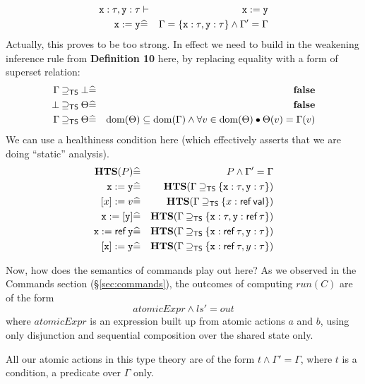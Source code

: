 \begin{eqnarray*}
   \mathtt{x} : \tau, \mathtt{y} : \tau &\vdash& \mathtt{x} := \mathtt{y}
\\ \mathtt{x} := \mathtt{y} &\widehat=& \Gamma = \{\mathtt{x} : \tau, \mathtt{y} : \tau\} \land \Gamma'=\Gamma
\end{eqnarray*}
Actually, this proves to be too strong.
In effect we need to build in the weakening inference rule
from \textbf{Definition 10} here, by replacing equality with a form of
superset relation:
\begin{eqnarray*}
   \Gamma \mathbin{\supseteq_{\mathsf{TS}}} \bot &\widehat=& \mathbf{false}
\\ \bot \mathbin{\supseteq_{\mathsf{TS}}} \Theta &\widehat=& \mathbf{false}
\\ \Gamma \mathbin{\supseteq_{\mathsf{TS}}} \Theta
   &\widehat=&
   \mathrm{dom}(\Theta)\subseteq \mathrm{dom}(\Gamma)
   \land
   \forall v \in \mathrm{dom}(\Theta) \bullet \Theta(v) = \Gamma(v)
\end{eqnarray*}
We can use a healthiness condition here
(which effectively asserts that we are doing ``static'' analysis).
\begin{eqnarray*}
  \mathbf{HTS}(P) &\widehat=& P \land \Gamma'=\Gamma
  \\ \mathtt{x} := \mathtt{y}     &\widehat=& \mathbf{HTS}(\Gamma \mathbin{\supseteq_{\mathsf{TS}}} \{\mathtt{x} : \tau, \mathtt{y} : \tau\})
\\ ~[x]:=v          &\widehat=& \mathbf{HTS}(\Gamma \mathbin{\supseteq_{\mathsf{TS}}} \{x: \mathop{\mathsf{ref}} \mathsf{val}\})
\\ \mathtt{x} := [\mathtt{y}]     &\widehat=& \mathbf{HTS}(\Gamma \mathbin{\supseteq_{\mathsf{TS}}} \{\mathtt{x}:\tau, \mathtt{y}:\mathop{\mathsf{ref}}\tau\})
\\ \mathtt{x} := \mathop{\mathsf{ref}} \mathtt{y} &\widehat=& \mathbf{HTS}(\Gamma \mathbin{\supseteq_{\mathsf{TS}}} \{\mathtt{x} : \mathop{\mathsf{ref}}\tau, \mathtt{y}:\tau\})
\\ ~[\mathtt{x}] := \mathtt{y}    &\widehat=& \mathbf{HTS}(\Gamma \mathbin{\supseteq_{\mathsf{TS}}} \{\mathtt{x} : \mathop{\mathsf{ref}}\tau, y:\tau\})
\end{eqnarray*}

Now, how does the semantics of commands play out here?
As we observed in the Commands section (\S\ref{sec:commands}),
the outcomes of computing $run(C)$
are of the form
\[
  atomicExpr \land ls'=out
\]
where $atomicExpr$ is an expression built up from atomic actions
$a$ and $b$, using only disjunction and sequential composition
over the shared state only.

All our atomic actions in this type theory
are of the form $t \land \Gamma'=\Gamma$,
where $t$ is a condition, a predicate over $\Gamma$ only.

